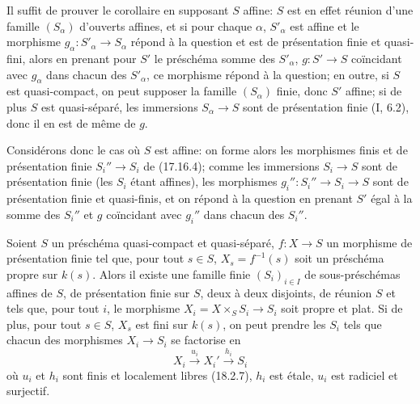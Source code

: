 Il suffit de prouver le corollaire en supposant $S$ affine: $S$ est en effet réunion d'une famille $(S_\alpha)$ d'ouverts affines, et si pour chaque $\alpha$, $S'_\alpha$ est affine et le morphisme $g_\alpha:S'_\alpha\to S_\alpha$ répond à la question et est de présentation finie et quasi-fini, alors en prenant pour $S'$ le préschéma somme des $S'_\alpha$, $g:S'\to S$ coïncidant avec $g_\alpha$ dans chacun des $S'_\alpha$, ce morphisme répond à la question; en outre, si $S$ est quasi-compact, on peut supposer la famille $(S_\alpha)$ finie, donc $S'$ affine; si de plus $S$ est quasi-séparé, les immersions $S_\alpha\to S$ sont de présentation finie (I, 6.2), donc il en est de même de $g$.

Considérons donc le cas où $S$ est affine: on forme alors les morphismes finis et de présentation finie $S_i''\to S_i$ de (17.16.4); comme les immersions $S_i\to S$ sont de présentation finie (les $S_i$ étant affines), les morphismes $g_i'':S_i''\to S_i\to S$ sont de présentation finie et quasi-finis, et on répond à la question en prenant $S'$ égal à la somme des $S_i''$ et $g$ coïncidant avec $g_i''$ dans chacun des $S_i''$.

\begin{proposition}[17.16.6]
\label{IV.17.16.6}
Soient $S$ un préschéma quasi-compact et quasi-séparé, $f:X\to S$ un morphisme de présentation finie tel que, pour tout $s\in S$, $X_s=f^{-1}(s)$ soit un préschéma propre sur $k(s)$. Alors il existe une famille finie $(S_i)_{i\in I}$ de sous-préschémas affines de $S$, de présentation finie sur $S$, deux à deux disjoints, de réunion $S$ et tels que, pour tout $i$, le morphisme $X_i=X\times_S S_i\to S_i$ soit propre et plat. Si de plus, pour tout $s\in S$, $X_s$ est fini sur $k(s)$, on peut prendre les $S_i$ tels que chacun des morphismes $X_i\to S_i$ se factorise en
\[
  X_i\xrightarrow{u_i}X_i'\xrightarrow{h_i}S_i
\]
où $u_i$ et $h_i$ sont finis et localement libres (18.2.7), $h_i$ est étale, $u_i$ est radiciel et surjectif.
\end{proposition}

